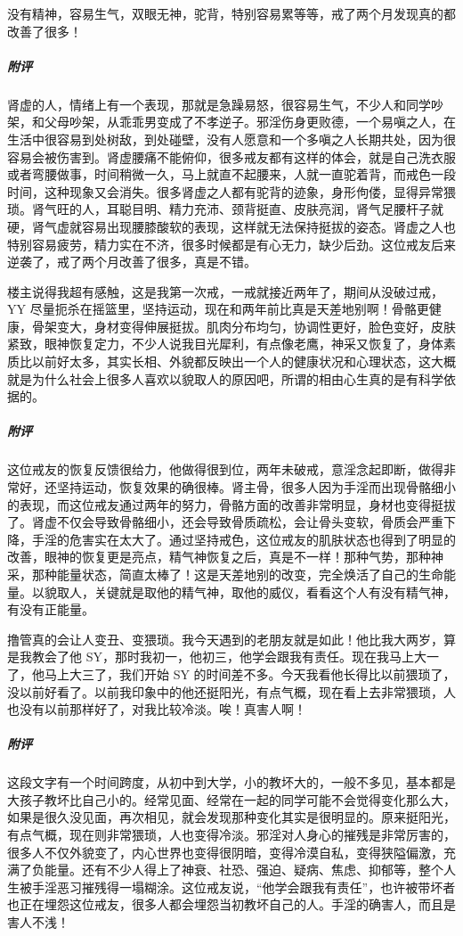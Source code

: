 \begin{case}[变丑]
    没有精神，容易生气，双眼无神，驼背，特别容易累等等，戒了两个月发现真的都改善了很多！
    \subparagraph{附评} 肾虚的人，情绪上有一个表现，那就是急躁易怒，很容易生气，不少人和同学吵架，和父母吵架，从乖乖男变成了不孝逆子。邪淫伤身更败德，一个易嗔之人，在生活中很容易到处树敌，到处碰壁，没有人愿意和一个多嗔之人长期共处，因为很容易会被伤害到。肾虚腰痛不能俯仰，很多戒友都有这样的体会，就是自己洗衣服或者弯腰做事，时间稍微一久，马上就直不起腰来，人就一直驼着背，而戒色一段时间，这种现象又会消失。很多肾虚之人都有驼背的迹象，身形佝偻，显得异常猥琐。肾气旺的人，耳聪目明、精力充沛、颈背挺直、皮肤亮润，肾气足腰杆子就硬，肾气虚就容易出现腰膝酸软的表现，这样就无法保持挺拔的姿态。肾虚之人也特别容易疲劳，精力实在不济，很多时候都是有心无力，缺少后劲。这位戒友后来逆袭了，戒了两个月改善了很多，真是不错。
\end{case}

\begin{case}[变丑]
    楼主说得我超有感触，这是我第一次戒，一戒就接近两年了，期间从没破过戒，YY 尽量扼杀在摇篮里，坚持运动，现在和两年前比真是天差地别啊！骨骼更健康，骨架变大，身材变得伸展挺拔。肌肉分布均匀，协调性更好，脸色变好，皮肤紧致，眼神恢复定力，不少人说我目光犀利，有点像老鹰，神采又恢复了，身体素质比以前好太多，其实长相、外貌都反映出一个人的健康状况和心理状态，这大概就是为什么社会上很多人喜欢以貌取人的原因吧，所谓的相由心生真的是有科学依据的。
    \subparagraph{附评} 这位戒友的恢复反馈很给力，他做得很到位，两年未破戒，意淫念起即断，做得非常好，还坚持运动，恢复效果的确很棒。肾主骨，很多人因为手淫而出现骨骼细小的表现，而这位戒友通过两年的努力，骨骼方面的改善非常明显，身材也变得挺拔了。肾虚不仅会导致骨骼细小，还会导致骨质疏松，会让骨头变软，骨质会严重下降，手淫的危害实在太大了。通过坚持戒色，这位戒友的肌肤状态也得到了明显的改善，眼神的恢复更是亮点，精气神恢复之后，真是不一样！那种气势，那种神采，那种能量状态，简直太棒了！这是天差地别的改变，完全焕活了自己的生命能量。以貌取人，关键就是取他的精气神，取他的威仪，看看这个人有没有精气神，有没有正能量。
\end{case}

\begin{case}[变丑]
    撸管真的会让人变丑、变猥琐。我今天遇到的老朋友就是如此！他比我大两岁，算是我教会了他 SY，那时我初一，他初三，他学会跟我有责任。现在我马上大一了，他马上大三了，我们开始 SY 的时间差不多。今天我看他长得比以前猥琐了，没以前好看了。以前我印象中的他还挺阳光，有点气概，现在看上去非常猥琐，人也没有以前那样好了，对我比较冷淡。唉！真害人啊！
    \subparagraph{附评} 这段文字有一个时间跨度，从初中到大学，小的教坏大的，一般不多见，基本都是大孩子教坏比自己小的。经常见面、经常在一起的同学可能不会觉得变化那么大，如果是很久没见面，再次相见，就会发现那种变化其实是很明显的。原来挺阳光，有点气概，现在则非常猥琐，人也变得冷淡。邪淫对人身心的摧残是非常厉害的，很多人不仅外貌变了，内心世界也变得很阴暗，变得冷漠自私，变得狭隘偏激，充满了负能量。还有不少人得上了神衰、社恐、强迫、疑病、焦虑、抑郁等，整个人生被手淫恶习摧残得一塌糊涂。这位戒友说，“他学会跟我有责任”，也许被带坏者也正在埋怨这位戒友，很多人都会埋怨当初教坏自己的人。手淫的确害人，而且是害人不浅！
\end{case}

